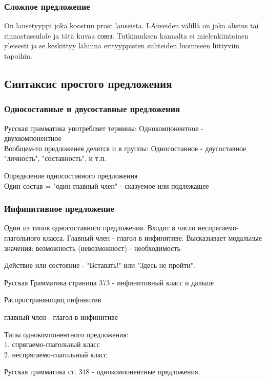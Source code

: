 
\subsubsection{Сложное предложение}

On lausetyyppi joka koostuu prost lauseista. LAuseiden välillä on joko alistus tai rinnastussuhde ja tätä kuvaa союз. Tutkimuksen kannalta ei mielenkiintoinen yleisesti ja se keskittyy lähinnä erityyppisten suhteiden luomiseen liittyviin tapoihin. 

\subsection{Синтаксис простого предложения}

\subsubsection{Односоставные и двусоставные предложения}

Русская грамматика употребляет термины:
Однокомпонентное - двухкомпонентное \\

Вообщем-то предложенея делятся и в группы:
Односоставное - двусоставное \\

"личность", "составность", и т.п.


Определение односоставного предложения  \\

Один состав = "один главный член" -  сказуемое или подлежащее

\subsubsection{Инфинитивное предложение}

Один из типов односоставного предложения. Входит в число неспрягаемо-глагольного класса. Главный член - глагол в инфинитиве. Высказывает модальные значения: возможность (невозможност) - необходимость 

Действие или состояние - "Вставать!" или "Здесь не пройти".

Русская Грамматика страница 373 - инфинитивный класс и дальше

Распространяющиц инфинитив

главный член - глагол в инфинитиве

Типы однокомпонентного предложения: \\ 
	1. спрягаемо-глагольный класс \\
	2. неспрягаемо-глагольный класс

Русская грамматика ст. 348 - однокомпонентные предложения.
